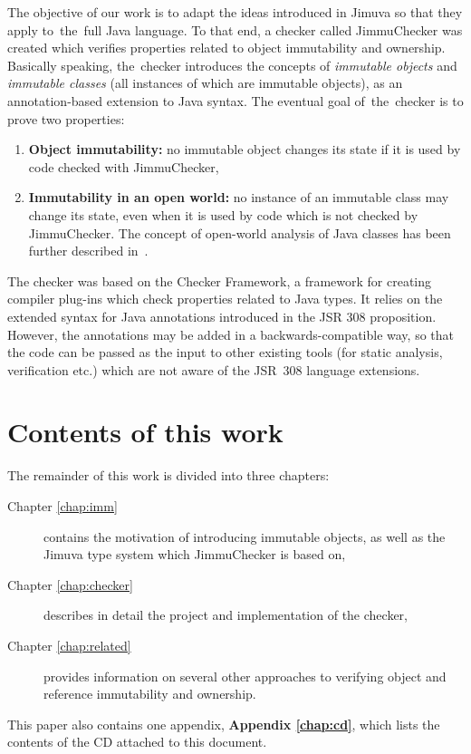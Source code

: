 \documentclass{pracamgr}
\theoremstyle{break}
\theoremstyle{break}
\theoremstyle{break}
\begin{document}
The objective of our work is to adapt the ideas introduced in Jimuva
so that they apply to~the~full Java language. To that end, a checker
called JimmuChecker was created which ve\-ri\-fies properties related
to object immutability and ownership. Basically speaking, the~checker
introduces the concepts of \emph{immutable objects} and
\emph{immutable classes} (all instances of which are immutable
objects), as an annotation-based extension to Java syntax. The eventual
goal of~the~checker is to prove two properties:
\begin{enumerate}
\item \textbf{Object immutability:} no immutable object changes its
  state if it is used by code checked with JimmuChecker,
\item \textbf{Immutability in an open world:} no instance of an
  immutable class may change its state, even when it is used by code
  which is not checked by JimmuChecker. The concept of open-world
  analysis of Java classes has been further described
  in~\cite{openworld}.
\end{enumerate}
The checker was based on the Checker Framework, a framework for
creating compiler plug-ins which check properties related to Java
types. It relies on the extended syntax for Java annotations
introduced in the JSR 308 proposition. However, the annotations may be
added in a backwards-compatible way, so that the code can be passed as
the input to other existing tools (for static analysis, verification
etc.) which are not aware of the JSR~308 language extensions.

\section{Contents of this work}

The remainder of this work is divided into three chapters:
\begin{description}
\item[Chapter \ref{chap:imm}] contains the motivation of introducing
  immutable objects, as well as the Jimuva type system which
  JimmuChecker is based on,
\item[Chapter \ref{chap:checker}] describes in detail the project and
  implementation of the checker,
\item[Chapter \ref{chap:related}] provides information on several
  other approaches to verifying object and reference immutability and
  ownership.
\end{description}
This paper also contains one appendix, \textbf{Appendix
  \ref{chap:cd}}, which lists the contents of the CD attached to this
document.
\end{document}
